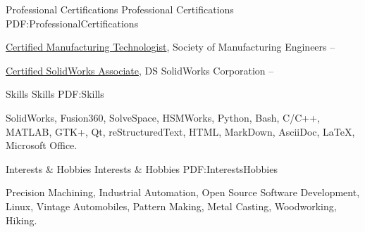 \documentclass[letterpaper,MMMyyyy,nonstopmode]{resume}
\begin{document}
\begin{Body}
\Section
{Professional Certifications}
{Professional Certifications}
{PDF:ProfessionalCertifications}

\BulletItem
\href{http://www.sme.org/cmfgt/}
{Certified Manufacturing Technologist},
Society of Manufacturing Engineers
\hfill
{} --

\BulletItem
\href{http://www.solidworks.com/sw/support/mcad-certification-programs.htm}
{Certified SolidWorks Associate},
DS SolidWorks Corporation
\hfill
{} --



\Section
{Skills}
{Skills}
{PDF:Skills}

\Entry
SolidWorks, Fusion360, SolveSpace, HSMWorks,
Python, Bash, C/C++, MATLAB, GTK+, Qt,
reStructuredText, HTML, MarkDown, AsciiDoc, \LaTeX,
Microsoft Office.



\Section
{Interests \& Hobbies}
{Interests \& Hobbies}
{PDF:InterestsHobbies}

\Entry
Precision Machining,
Industrial Automation,
Open Source Software Development,
Linux,
Vintage Automobiles,
Pattern Making, Metal Casting,
Woodworking, Hiking.

\end{Body}
\end{document}

